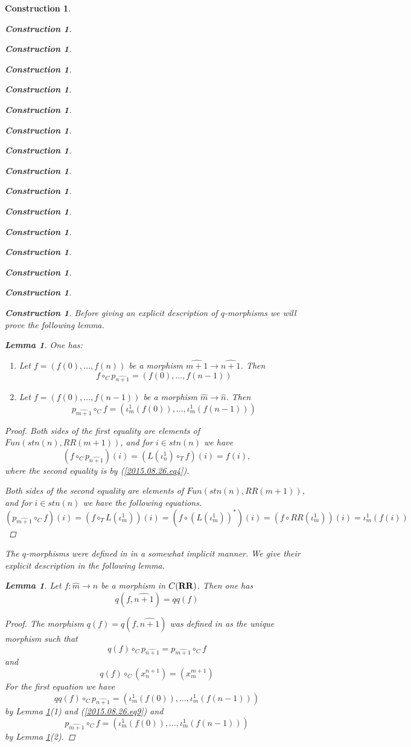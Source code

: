 \documentclass[12pt]{amsart}
\newtheorem{lemma}[proposition]{Lemma}
\numberwithin{proposition}{subsection}
\newtheorem{construction}[proposition]{Construction}
\newcommand{\llabel}[1]{\label{#1}}
\newcommand{\sr}{\rightarrow}
\newcommand{\wh}{\widehat}
\newcommand{\mbind}[1]{{#1^*}}
\newcommand{\RR}{{\bf RR}}
\begin{document}
\begin{construction}
\begin{construction}
\begin{construction}
\begin{construction}
\begin{construction}
\begin{construction}
\begin{construction}
\begin{construction}
\begin{construction}
\begin{construction}
\begin{construction}
\begin{construction}
\begin{construction}
\begin{construction}
\begin{construction}
\begin{construction}
Before giving an explicit description of $q$-morphisms we will prove the
following lemma.
%
\begin{lemma}
\llabel{2015.07.24.l1}
One has:
%
\begin{enumerate}
\item Let $f=(f(0),\dots,f(n))$ be a morphism $\wh{m+1}\sr\wh{n+1}$. Then 
%
$$f\circ_C p_{\wh{n+1}}=(f(0),\dots,f(n-1))$$
%
\item Let $f=(f(0),\dots,f(n-1))$ be a morphism $\wh{m}\sr \wh{n}$. Then 
%
$$p_{\wh{m+1}}\circ_C f=(\iota_m^1(f(0)),\dots,\iota_m^1(f(n-1)))$$
%
\end{enumerate}
\end{lemma}
%
\begin{proof}
Both sides of the first equality are elements of $Fun(stn(n), RR(m+1))$, and for $i\in stn(n)$ we have
%
$$(f\circ_C p_{\wh{n+1}})(i)=(L(\iota_{n}^1)\circ_T f)(i)=f(i),$$
%
where the second equality is by (\ref{2015.08.26.eq4}). 

Both sides of the second equality are elements of $Fun(stn(n), RR(m+1))$,
and for $i\in stn(n)$ we have the following equations.
%
$$(p_{\wh{m+1}}\circ_C f)(i)=(f\circ_T L(\iota_{m}^1))(i)=(f\circ \mbind{(L(\iota_{m}^1))})(i)=(f\circ RR(\iota_{m}^1))(i)=\iota_{m}^1(f(i))$$
%
\end{proof}
%
The $q$-morphisms were defined in \cite{LandC} in a somewhat implicit
manner. We give their explicit description in the following lemma.
%
\begin{lemma}
\llabel{2016.01.15.l3}
Let $f:\wh{m}\sr \wh{n}$ be a morphism in $C(\RR)$. Then one has
%
$$q(f,\wh{n+1})=qq(f)$$
%
\end{lemma}
%
\begin{proof}
The morphism $q(f)=q(f,\wh{n+1})$ was defined in \cite{LandC} as the unique
morphism such that
%
$$q(f)\circ_C p_{\wh{n+1}}=p_{\wh{m+1}}\circ_C f$$
%
and
%
$$q(f)\circ_C (x_n^{n+1})=(x_m^{m+1})$$
%
For the first equation we have
%
$$qq(f)\circ_C p_{\wh{n+1}}=(\iota_m^1(f(0)),\dots,\iota_m^1(f(n-1)))$$
%
by Lemma \ref{2015.07.24.l1}(1) and (\ref{2015.08.26.eq9}) and
%
$$p_{\wh{m+1}}\circ_C f = (\iota_m^1(f(0)),\dots,\iota_m^1(f(n-1)))$$
%
by Lemma \ref{2015.07.24.l1}(2).


\end{proof}
\end{construction}
\end{construction}
\end{construction}
\end{construction}
\end{construction}
\end{construction}
\end{construction}
\end{construction}
\end{construction}
\end{construction}
\end{construction}
\end{construction}
\end{construction}
\end{construction}
\end{construction}
\end{construction}
\end{document}
